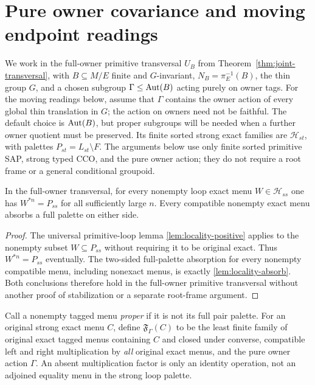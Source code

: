 \section{Pure owner covariance and moving endpoint readings}
\label{sec:covariant-owner}
We work in the full-owner primitive transversal $U_B$
from Theorem~\ref{thm:joint-transversal}, with
$B\subseteq M/E$ finite and $G$-invariant,
$N_B=\pi_E^{-1}(B)$, the thin group $G$, and
a chosen subgroup $\Gamma\le\operatorname{Aut}(B)$ acting purely on owner tags.
For the moving readings below, assume that $\Gamma$ contains the
owner action of every global thin translation in $G$; the action
on owners need not be faithful. The default choice is $\operatorname{Aut}(B)$,
but proper subgroups will be needed when a further owner quotient
must be preserved.
Its finite sorted strong exact families are
$\mathcal H_{st}$, with palettes $P_{st}=L_{st}\setminus F$.
The arguments below use only finite sorted primitive SAP,
strong typed CCO, and the pure owner action; they do not
require a root frame or a general conditional groupoid.

\begin{lemma}\label{lem:covariant-loop-full}
In the full-owner transversal, for every nonempty loop exact
menu $W\in\mathcal H_{ss}$ one has
$W^{*n}=P_{ss}$ for all sufficiently large $n$.  Every compatible
nonempty exact menu absorbs a full palette on either side.
\end{lemma}
\begin{proof}
The universal primitive-loop lemma
\cref{lem:locality-positive} applies to the nonempty subset
$W\subseteq P_{ss}$ without requiring it to be original
exact.  Thus $W^{*n}=P_{ss}$ eventually.  The two-sided
full-palette absorption for every nonempty compatible menu,
including nonexact menus, is exactly
\cref{lem:locality-absorb}.  Both conclusions therefore
hold in the full-owner primitive transversal without another
proof of stabilization or a separate root-frame argument.
\end{proof}

Call a nonempty tagged menu \emph{proper} if it is not its full
pair palette.  For an original strong exact menu $C$, define
$\mathfrak F_\Gamma(C)$ to be the least finite family of
original exact tagged menus containing $C$ and closed under
converse, compatible left and right multiplication by \emph{all}
original exact menus, and the pure owner action $\Gamma$.
An absent multiplication factor is only an identity operation,
not an adjoined equality menu in the strong loop palette.

